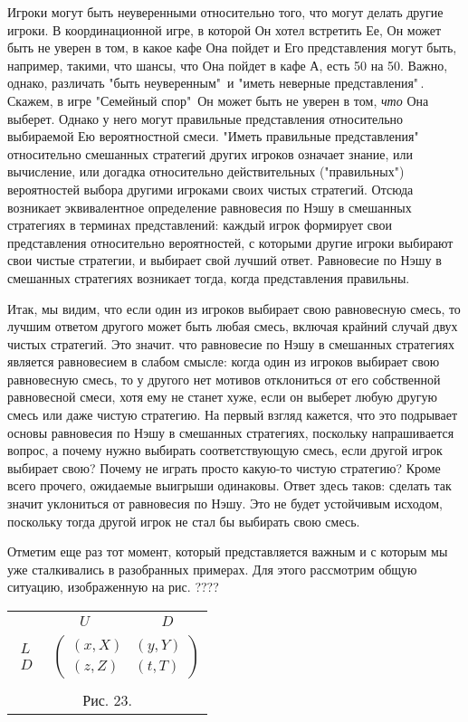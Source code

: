 \documentclass[12pt]{article}
\begin{document}
{Игроки могут быть неуверенными относительно того, что могут делать
другие игроки. В координационной игре, в которой Он хотел встретить
Ее, Он может быть не уверен в том, в какое кафе Она пойдет и Его
представления могут быть, например, такими, что шансы, что Она
пойдет в кафе А, есть 50 на 50. Важно, однако, различать "быть
неуверенным"\, и "иметь неверные представления"\,. Скажем, в игре
"Семейный спор"\, Он может быть не уверен в том, \emph{что} Она
выберет. Однако у него могут правильные представления относительно
выбираемой Ею вероятностной смеси. "Иметь правильные
представления"\, относительно смешанных стратегий других игроков
означает знание, или вычисление, или догадка относительно
действительных ("правильных") вероятностей выбора другими игроками
своих чистых стратегий. Отсюда возникает эквивалентное определение
равновесия по Нэшу в смешанных стратегиях в терминах представлений:
каждый игрок формирует свои представления относительно вероятностей,
с которыми другие игроки выбирают свои чистые стратегии, и выбирает
свой лучший ответ. Равновесие по Нэшу в смешанных стратегиях
возникает тогда, когда представления правильны.

Итак, мы видим, что если один из игроков выбирает свою равновесную
смесь, то лучшим ответом другого может быть любая смесь, включая
крайний случай двух чистых стратегий. Это значит. что равновесие
по Нэшу в смешанных стратегиях является равновесием в слабом смысле:
когда один из игроков выбирает свою равновесную смесь, то у другого
нет мотивов отклониться от его собственной равновесной смеси, хотя
ему не станет хуже, если он выберет любую другую смесь или даже чистую
стратегию. На первый взгляд кажется, что это подрывает основы
равновесия по Нэшу в смешанных стратегиях, поскольку напрашивается
вопрос, а почему нужно выбирать соответствующую смесь, если
другой игрок выбирает свою? Почему не играть просто какую-то
чистую стратегию? Кроме всего прочего, ожидаемые выигрыши одинаковы.
Ответ здесь таков: сделать так значит уклониться от равновесия по Нэшу.
Это не будет устойчивым исходом, поскольку тогда другой игрок не стал
бы выбирать свою смесь.

Отметим еще раз тот момент, который представляется важным и с которым
мы уже сталкивались в разобранных примерах. Для этого рассмотрим
общую ситуацию, изображенную на рис. ????

\begin{center}
\begin{tabular}{cc}
&$\begin{array}{cc} U\qquad&\qquad\, D\end{array}$\\
$\begin{array}{c} L\\ D\end{array}$& $\left(\begin{array}{cc}
(x,X)& (y,Y)\\
(z,Z)&(t,T)\end{array}\right)$\\
\multicolumn{2}{c}{}\\
\multicolumn{2}{c}{Рис. 23.}\\
\end{tabular}
\end{center}

}
\end{document}

